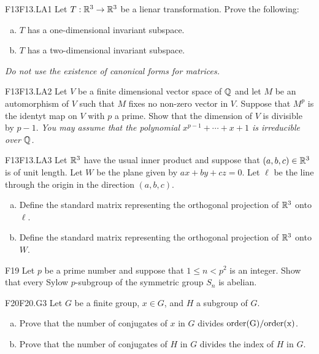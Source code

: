 \documentclass[../AlgebraQualSolutions.tex]{subfiles}
\begin{document}
	\begin{prob}{F13}{F13.LA1}
		Let $T: \mathbb{R}^3 \to \mathbb{R}^3$ be a lienar transformation. Prove the following:
		\begin{enumerate}[(a)]
			\item $T$ has a one-dimensional invariant subspace.
			\item $T$ has a two-dimensional invariant subspace.
		\end{enumerate}

		\emph{ Do not use the existence of canonical forms for matrices.}
	\end{prob}

	\begin{prob}{F13}{F13.LA2}
		Let $V$ be a finite dimensional vector space of $\mathbb{Q}$ and let $M$ be an automorphism of $V$ such that $M$ fixes no non-zero vector in $V$. Suppose that $M^p$ is the identyt map on $V$ with $p$ a prime. Show that the dimension of $V$ is divisible by $p-1$. \emph{ You may assume that the polynomial $x^{p-1} + \cdots + x + 1$ is irreducible  over $\mathbb{Q}$.}
	\end{prob}

	\begin{prob}{F13}{F13.LA3}
		Let $\mathbb{R}^3$ have  the usual inner product and suppose that $(a,b,c) \in \mathbb{R}^3$ is of unit length. Let $W$ be the plane given by $ax + by + cz = 0$. Let $\ell$ be the line through the origin in the direction $(a,b,c)$.
		\begin{enumerate}[(a)]
			\item Define the standard matrix representing the orthogonal projection of $\mathbb{R}^3$ onto $\ell$.
			\item Define the standard matrix representing the orthogonal projection of $\mathbb{R}^3$ onto $W$.
		\end{enumerate}
	\end{prob}

	\begin{prob}{F19}{}
	Let $p$ be a prime number and suppose that $1 \leq n <p^2$ is an integer. Show that every Sylow $p$-subgroup of the symmetric group $S_n$ is abelian.
	\end{prob}
	

	\begin{prob}{F20}{F20.G3}
	Let $G$ be a finite group, $x \in G$, and $H$ a subgroup of $G$.
	\begin{enumerate}[(a)]
	\item Prove that the number of conjugates of $x$ in $G$ divides $\rm{order}(G)/\rm{order}(x)$.
	\item Prove that the number of conjugates of $H$ in $G$ divides the index of $H$ in $G$.
	\end{enumerate}
	\end{prob}
\end{document}
